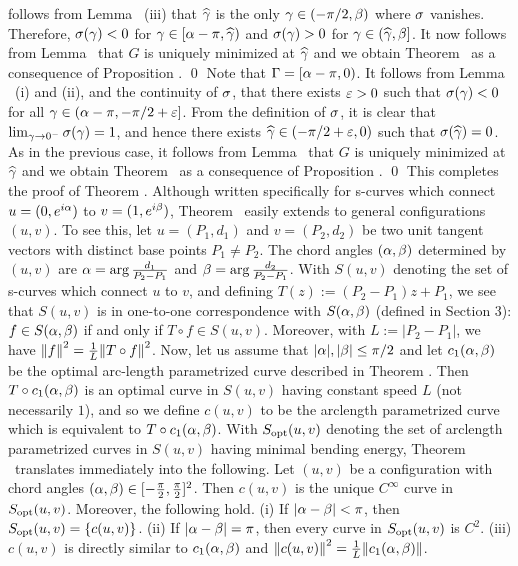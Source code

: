 follows from Lemma \wasabi\ (iii) that $\widehat{\gamma}$ is the only $\gamma\in(-\pi/2,\beta)$ where $\sigma$ vanishes. Therefore,
$\sigma(\gamma)<0$ for $\gamma\in[\alpha-\pi,\widehat{\gamma})$ and $\sigma(\gamma)>0$ for $\gamma\in(\widehat{\gamma},\beta]$. It now follows from Lemma
\randang\ that $G$ is uniquely minimized at $\widehat{\gamma}$ and we obtain Theorem \sunique\ as a consequence of Proposition \fivetwelve.
\qed\enddemo
%
Note that $\Gamma=[\alpha-\pi,0)$. It follows from Lemma \wasabi\ (i) and (ii), and the continuity of $\sigma$, that there exists
$\varepsilon>0$ such that $\sigma(\gamma)<0$ for all $\gamma\in(\alpha-\pi,-\pi/2+\varepsilon]$. From the definition of $\sigma$, it is clear that
$\lim_{\gamma\to 0^-}\sigma(\gamma)=1$, and hence there exists $\widehat{\gamma}\in(-\pi/2+\varepsilon,0)$ such that $\sigma(\widehat{\gamma})=0$. As in the previous case,
it follows from Lemma \randang\ that $G$ is uniquely minimized at $\widehat{\gamma}$ and we obtain Theorem \sunique\ as a consequence
of Proposition \fivetwelve.
\qed\enddemo
%
This completes the proof of Theorem \sunique.
%
%
Although written specifically for s-curves which connect $u=(0,e^{i\alpha})$ to $v=(1,e^{i\beta})$, Theorem \sunique\ easily
extends to general configurations $(u,v)$.  To see this, let $u=(P_1,d_1)$ and $v=(P_2,d_2)$ be two unit tangent vectors 
with distinct base points $P_1\neq P_2$.  The chord angles $(\alpha,\beta)$ determined by $(u,v)$ are
$\alpha=\arg\frac{d_1}{P_2-P_1}$ and  $\beta=\arg\frac{d_2}{P_2-P_1}$.  With $S(u,v)$ denoting the set of s-curves which connect $u$ to $v$,
and defining $T(z):=(P_2-P_1)z+P_1$, we see that
$S(u,v)$ is in one-to-one correspondence with $S(\alpha,\beta)$ (defined in Section 3):
$f\in S(\alpha,\beta)$ if and only if $T\circ f \in S(u,v)$. Moreover, with $L:=|P_2-P_1|$, we have
${\Vert f \Vert}^2 = \frac1L {\Vert T\circ f \Vert}^2$. Now, let us assume that $|\alpha|,|\beta|\leq \pi/2$ and let $c_1(\alpha,\beta)$ be the optimal 
arc-length parametrized curve described in
Theorem \sunique. Then $T\circ c_1(\alpha,\beta)$ is an optimal curve in $S(u,v)$ having constant speed $L$ (not necessarily $1$), 
and so we define
$c(u,v)$ to be the arclength parametrized curve which is equivalent to $T\circ c_1(\alpha,\beta)$. 
With $S_{\text{opt}}(u,v)$ denoting the set of arclength parametrized curves in $S(u,v)$ having minimal bending energy,
Theorem \sunique\ translates immediately into the following.
%
 Let $(u,v)$ be a configuration with chord angles $(\alpha,\beta)\in [-\frac\pi2,\frac\pi2]^2$.
Then $c(u,v)$ is the unique $C^\infty$ curve in $S_{\text{opt}}(u,v)$. Moreover, the following hold.\newline
(i) If $\left\vert {\alpha-\beta} \right\vert<\pi$, then $S_{\text{opt}}(u,v)=\{c(u,v)\}$.\newline
(ii) If $\left\vert {\alpha-\beta} \right\vert=\pi$, then every curve in $S_{\text{opt}}(u,v)$ is $C^2$. \newline
(iii)  $c(u,v)$ is directly similar to $c_1(\alpha,\beta)$ and ${\Vert c(u,v) \Vert}^2 = \frac1L {\Vert c_1(\alpha,\beta) \Vert}$.
\endproclaim

